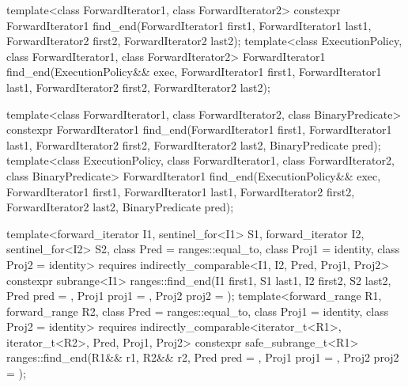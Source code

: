 %
\begin{itemdecl}
template<class ForwardIterator1, class ForwardIterator2>
  constexpr ForwardIterator1
    find_end(ForwardIterator1 first1, ForwardIterator1 last1,
             ForwardIterator2 first2, ForwardIterator2 last2);
template<class ExecutionPolicy, class ForwardIterator1, class ForwardIterator2>
  ForwardIterator1
    find_end(ExecutionPolicy&& exec,
             ForwardIterator1 first1, ForwardIterator1 last1,
             ForwardIterator2 first2, ForwardIterator2 last2);

template<class ForwardIterator1, class ForwardIterator2,
         class BinaryPredicate>
  constexpr ForwardIterator1
    find_end(ForwardIterator1 first1, ForwardIterator1 last1,
             ForwardIterator2 first2, ForwardIterator2 last2,
             BinaryPredicate pred);
template<class ExecutionPolicy, class ForwardIterator1, class ForwardIterator2,
         class BinaryPredicate>
  ForwardIterator1
    find_end(ExecutionPolicy&& exec,
             ForwardIterator1 first1, ForwardIterator1 last1,
             ForwardIterator2 first2, ForwardIterator2 last2,
             BinaryPredicate pred);

template<forward_iterator I1, sentinel_for<I1> S1, forward_iterator I2, sentinel_for<I2> S2,
         class Pred = ranges::equal_to, class Proj1 = identity, class Proj2 = identity>
  requires indirectly_comparable<I1, I2, Pred, Proj1, Proj2>
  constexpr subrange<I1>
    ranges::find_end(I1 first1, S1 last1, I2 first2, S2 last2, Pred pred = {},
                     Proj1 proj1 = {}, Proj2 proj2 = {});
template<forward_range R1, forward_range R2,
         class Pred = ranges::equal_to, class Proj1 = identity, class Proj2 = identity>
  requires indirectly_comparable<iterator_t<R1>, iterator_t<R2>, Pred, Proj1, Proj2>
  constexpr safe_subrange_t<R1>
    ranges::find_end(R1&& r1, R2&& r2, Pred pred = {},
                     Proj1 proj1 = {}, Proj2 proj2 = {});
\end{itemdecl}

